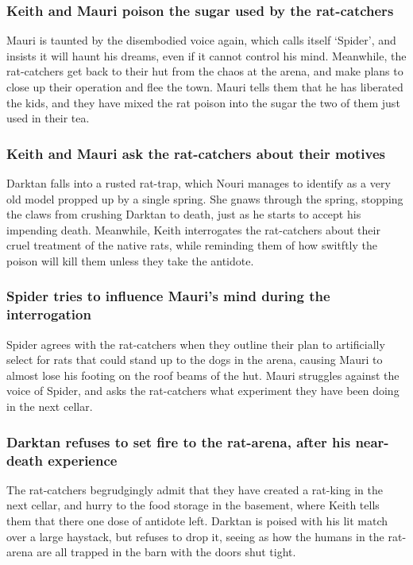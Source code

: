 \subsubsection{\Gls{Keith} and \Gls{Mauri} poison the sugar used by the rat-catchers}
\Gls{Mauri} is taunted by the disembodied voice again, which calls itself `\Gls{Spider}', and
insists it will haunt his dreams, even if it cannot control his mind. Meanwhile, the rat-catchers
get back to their hut from the chaos at the arena, and make plans to close up their operation and
flee the town. \Gls{Mauri} tells them that he has liberated the kids, and they have mixed the rat
poison into the sugar the two of them just used in their tea.

\subsubsection{\Gls{Keith} and \Gls{Mauri} ask the rat-catchers about their motives}
\Gls{Darktan} falls into a rusted rat-trap, which \Gls{Nouri} manages to identify as a very old
model propped up by a single spring. She gnaws through the spring, stopping the claws from crushing
\Gls{Darktan} to death, just as he starts to accept his impending death. Meanwhile, \Gls{Keith}
interrogates the rat-catchers about their cruel treatment of the native rats, while reminding them
of how switftly the poison will kill them unless they take the antidote.

\subsubsection{\Gls{Spider} tries to influence \Gls{Mauri}'s mind during the interrogation}
\Gls{Spider} agrees with the rat-catchers when they outline their plan to artificially select for
rats that could stand up to the dogs in the arena, causing \Gls{Mauri} to almost lose his footing
on the roof beams of the hut. \Gls{Mauri} struggles against the voice of \Gls{Spider}, and asks
the rat-catchers what experiment they have been doing in the next cellar.

\subsubsection{\Gls{Darktan} refuses to set fire to the rat-arena, after his near-death experience}
The rat-catchers begrudgingly admit that they have created a rat-king in the next cellar, and hurry
to the food storage in the basement, where \Gls{Keith} tells them that there one dose of antidote
left. \Gls{Darktan} is poised with his lit match over a large haystack, but refuses to drop it,
seeing as how the humans in the rat-arena are all trapped in the barn with the doors shut tight.

